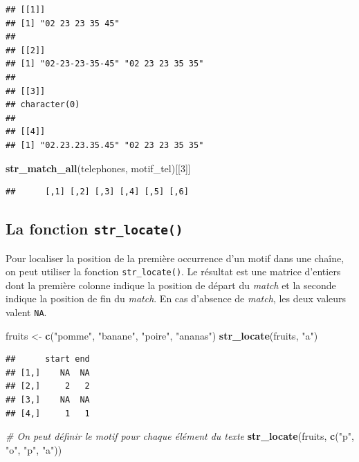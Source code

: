 \documentclass[
  11pt,
]{book}
\newenvironment{Shaded}{\begin{snugshade}}{\end{snugshade}}
\newcommand{\CommentTok}[1]{\textcolor[rgb]{0.56,0.35,0.01}{\textit{#1}}}
\newcommand{\DecValTok}[1]{\textcolor[rgb]{0.00,0.00,0.81}{#1}}
\newcommand{\KeywordTok}[1]{\textcolor[rgb]{0.13,0.29,0.53}{\textbf{#1}}}
\newcommand{\NormalTok}[1]{#1}
\newcommand{\StringTok}[1]{\textcolor[rgb]{0.31,0.60,0.02}{#1}}
\numberwithin{equation}{section}
\numberwithin{countremarque}{section}
\begin{document}
\begin{lstlisting}
## [[1]]
## [1] "02 23 23 35 45"
## 
## [[2]]
## [1] "02-23-23-35-45" "02 23 23 35 35"
## 
## [[3]]
## character(0)
## 
## [[4]]
## [1] "02.23.23.35.45" "02 23 23 35 35"
\end{lstlisting}

\begin{Shaded}
\begin{Highlighting}[]
\KeywordTok{str\_match\_all}\NormalTok{(telephones, motif\_tel)[[}\DecValTok{3}\NormalTok{]]}
\end{Highlighting}
\end{Shaded}

\begin{lstlisting}
##      [,1] [,2] [,3] [,4] [,5] [,6]
\end{lstlisting}

\hypertarget{manip_regex_stringr_locate}{%
\subsection{\texorpdfstring{La fonction \texttt{str\_locate()}}{La fonction str\_locate()}}\label{manip_regex_stringr_locate}}

Pour localiser la position de la première occurrence d'un motif dans une chaîne, on peut utiliser la fonction \texttt{str\_locate()}. Le résultat est une matrice d'entiers dont la première colonne indique la position de départ du \emph{match} et la seconde indique la position de fin du \emph{match}. En cas d'absence de \emph{match}, les deux valeurs valent \texttt{NA}.

\begin{Shaded}
\begin{Highlighting}[]
\NormalTok{fruits \textless{}{-}}\StringTok{ }\KeywordTok{c}\NormalTok{(}\StringTok{"pomme"}\NormalTok{, }\StringTok{"banane"}\NormalTok{, }\StringTok{"poire"}\NormalTok{, }\StringTok{"ananas"}\NormalTok{)}
\KeywordTok{str\_locate}\NormalTok{(fruits, }\StringTok{"a"}\NormalTok{)}
\end{Highlighting}
\end{Shaded}

\begin{lstlisting}
##      start end
## [1,]    NA  NA
## [2,]     2   2
## [3,]    NA  NA
## [4,]     1   1
\end{lstlisting}

\begin{Shaded}
\begin{Highlighting}[]
\CommentTok{\# On peut définir le motif pour chaque élément du texte}
\KeywordTok{str\_locate}\NormalTok{(fruits, }\KeywordTok{c}\NormalTok{(}\StringTok{"p"}\NormalTok{, }\StringTok{"o"}\NormalTok{, }\StringTok{"p"}\NormalTok{, }\StringTok{"a"}\NormalTok{))}
\end{Highlighting}
\end{Shaded}
\end{document}

